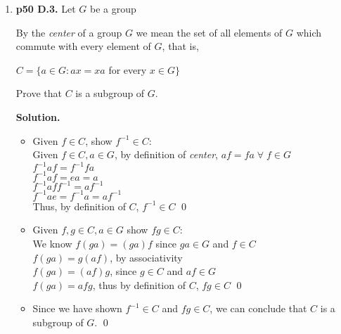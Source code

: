 \documentclass[11pt]{article}
\begin{document}
\begin{enumerate}
  For $x,y \in H \cap K$, we know $x,y \in H$ and $x,y \in K$ \\
  Since $H$ and $K$ are subgroups, they are closed under their operation. Thus $xy \in H$ and $xy \in K$ \\
  Thus $xy \in H \cap K$. \qed \\
  
  Since we have shown $x^{-1} \in H \cap K$ and $xy \in H \cap K$, we can conclude that $H \cap K$ is a subgroup of $G$. \qed \\

\item {\bfseries p50 D.3.} Let $G$ be a group
  
  By the \textit{center} of a group $G$ we mean the set of all elements of $G$ which commute with every element of $G$, that is,
  
  $C = \{ a \in G : ax = xa$ for every $x \in G\}$
  
  Prove that $C$ is a subgroup of $G$.
  
  {\bfseries Solution.}
  
  \begin{itemize}
  
	  \item Given $f \in C$, show $f^{-1} \in C$: \\
	  Given $f \in C, a \in G$, by definition of \textit{center}, $af = fa \; \forall \; f \in G$ \\
	  $f^{-1}af = f^{-1}fa$ \\
	  $f^{-1}af = ea = a$ \\
	  $f^{-1}aff^{-1} = af^{-1}$ \\
	  $f^{-1}ae = f^{-1}a = af^{-1}$ \\
	  Thus, by definition of $C$, $f^{-1} \in C$ \qed \\
	  
	  \item Given $f,g \in C, a \in G$ show $fg \in C$: \\
	  We know $f(ga) = (ga)f$ since $ga \in G$ and $f \in C$ \\
	  $f(ga) = g(af)$, by associativity \\
	  $f(ga) = (af)g$, since $g \in C$ and $af \in G$ \\
	  $f(ga) = afg$, thus by definition of $C$, $fg \in C$ \qed \\
	  
	  \item Since we have shown $f^{-1} \in C$ and $fg \in C$, we can conclude that $C$ is a subgroup of $G$. \qed
  
  \end{itemize}


\end{enumerate}
\end{document}
